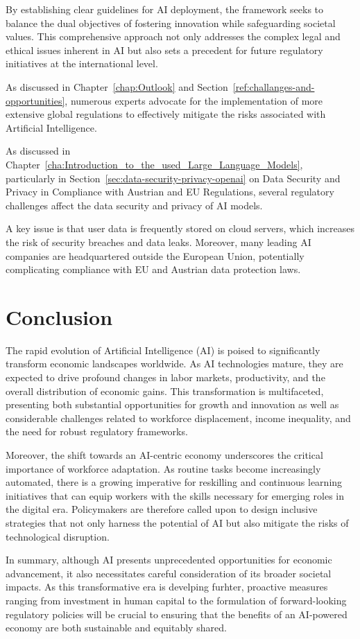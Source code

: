 By establishing clear guidelines for AI deployment, the framework seeks to balance the dual objectives of fostering innovation while safeguarding societal values. This comprehensive approach not only addresses the complex legal and ethical issues inherent in AI but also sets a precedent for future regulatory initiatives at the international level.
\cite{act-eu-ai}

As discussed in Chapter~\ref{chap:Outlook} and Section~\ref{ref:challanges-and-opportunities}, numerous experts advocate for the implementation of more extensive global regulations to effectively mitigate the risks associated with Artificial Intelligence.


As discussed in Chapter~\ref{cha:Introduction_to_the_used_Large_Language_Models}, particularly in Section~\ref{sec:data-security-privacy-openai} on Data Security and Privacy in Compliance with Austrian and EU Regulations, several regulatory challenges affect the data security and privacy of AI models.

A key issue is that user data is frequently stored on cloud servers, which increases the risk of security breaches and data leaks. Moreover, many leading AI companies are headquartered outside the European Union, potentially complicating compliance with EU and Austrian data protection laws.


\section{Conclusion}
\label{sec:conclusion}

The rapid evolution of Artificial Intelligence (AI) is poised to significantly transform economic landscapes worldwide. 
As AI technologies mature, they are expected to drive profound changes in labor markets, productivity, and the overall distribution of economic gains. 
This transformation is multifaceted, presenting both substantial opportunities for growth and innovation as well as considerable challenges related to workforce displacement,
income inequality, and the need for robust regulatory frameworks.

Moreover, the shift towards an AI-centric economy underscores the critical importance of workforce adaptation. 
As routine tasks become increasingly automated, there is a growing imperative for reskilling and continuous learning initiatives that can equip workers with the skills 
necessary for emerging roles in the digital era. Policymakers are therefore called upon to design inclusive strategies that not only harness the potential 
of AI but also mitigate the risks of technological disruption.

In summary, although AI presents unprecedented opportunities for economic advancement, 
it also necessitates careful consideration of its broader societal impacts. As this transformative era is develping furhter, 
proactive measures ranging from investment in human capital to the formulation of forward-looking regulatory policies 
will be crucial to ensuring that the benefits of an AI-powered economy are both sustainable and equitably shared.

